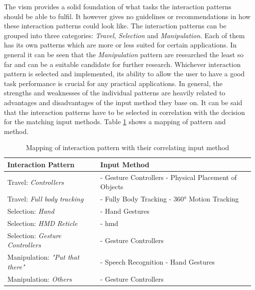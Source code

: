 The \gls{vism} provides a solid foundation of what tasks the interaction patterns should be able to fulfil. It however gives no guidelines or recommendations in how these interaction patterns could look like. The interaction patterns can be grouped into three categories: \textit{Travel}, \textit{Selection} and \textit{Manipulation}. Each of them has its own patterns which are more or less suited for certain applications. In general it can be seen that the \textit{Manipulation} pattern are researched the least so far and can be a suitable candidate for further research. Whichever interaction pattern is selected and implemented, its ability to allow the user to have a good task performance is crucial for any practical applications. \newline
In general, the strengths and weaknesses of the individual patterns are heavily related to advantages and disadvantages of the input method they base on. It can be said that the interaction patterns have to be selected in correlation with the decision for the matching input methods. Table \ref{tbl:pattermethodmapping} shows a mapping of pattern and method.
\begin{table}[t]
	\begin{center}
		\begin{tabular}{ | p{4cm} | p{6cm} | } 
			\hline
			\textbf{Interaction Pattern} & \textbf{Input Method} \\
			\hline
			Travel:  \newline \textit{Controllers} &
			- Gesture Controllers \newline - Physical Placement of Objects \\
			\hline
			Travel: \newline \textit{Full body tracking} &
			- Fully Body Tracking \newline - 360° Motion Tracking \\
			\hline
			Selection: \newline \textit{Hand} & 
			- Hand Gestures \\
			\hline
			Selection: \newline \textit{HMD Reticle} &
			- \gls{hmd} \\
			\hline
			Selection: \newline \textit{Gesture Controllers} &
			- Gesture Controllers \\ 
			\hline
			Manipulation: \newline \textit{"Put that there"} &
			- Speech Recognition \newline - Hand Gestures \\ 
			\hline
			Manipulation: \newline \textit{Others} &
			- Gesture Controllers \\ 
			\hline
		\end{tabular}
		\caption{Mapping of interaction pattern with their correlating input method}
		\label{tbl:pattermethodmapping}
	\end{center}
\end{table}

